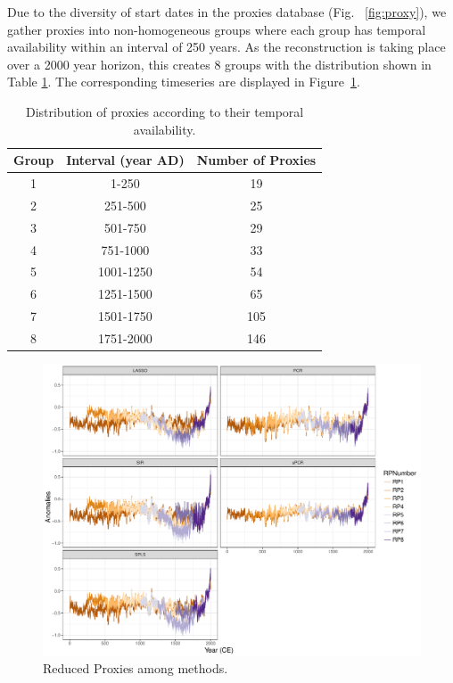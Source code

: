 \documentclass[11pt]{amsart}
\theoremstyle{plain}
\theoremstyle{definition}
\theoremstyle{remark}
\begin{document}
Due to the diversity of start dates in the proxies database (Fig. ~\ref{fig:proxy}), we gather proxies into non-homogeneous groups where each group has temporal availability within an
interval of 250 years. As the reconstruction is taking place over a 2000 year
horizon, this creates 8 groups with the distribution shown in Table \ref{tab:distdate}. The corresponding timeseries are displayed in Figure~\ref{fig:RPs}.



\begin{table}
  \centering
  \begin{tabular}{c|c|c}
    \toprule
    Group & Interval (year AD) & Number of Proxies\\
    \midrule
    1 & 1-250 & 19 \\
    2 & 251-500 & 25 \\
    3 & 501-750 & 29 \\
    4 & 751-1000 & 33 \\
    5 & 1001-1250 & 54 \\
    6 & 1251-1500 & 65 \\
    7 & 1501-1750 & 105 \\
    8 & 1751-2000 & 146 \\
    \bottomrule
  \end{tabular}
  \caption{Distribution of proxies according to their temporal availability.}
  \label{tab:distdate}
\end{table}


\begin{figure}[H]
  \centering
 \includegraphics[scale=0.38]{RPs_type} 
  \caption{Reduced Proxies among methods.}
  \label{fig:RPs}
\end{figure}
\end{document}
